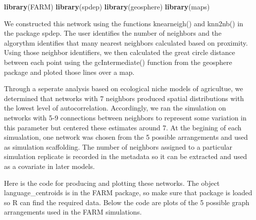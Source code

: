 \documentclass[]{book}
\newenvironment{Shaded}{\begin{snugshade}}{\end{snugshade}}
\newcommand{\KeywordTok}[1]{\textcolor[rgb]{0.13,0.29,0.53}{\textbf{{#1}}}}
\newcommand{\NormalTok}[1]{{#1}}
\theoremstyle{definition}
\theoremstyle{definition}
\theoremstyle{definition}
\theoremstyle{remark}
\begin{document}
\begin{Shaded}
\begin{Highlighting}[]
\KeywordTok{library}\NormalTok{(FARM)}
\KeywordTok{library}\NormalTok{(spdep)}
\KeywordTok{library}\NormalTok{(geosphere)}
\KeywordTok{library}\NormalTok{(maps)}
\end{Highlighting}
\end{Shaded}

We constructed this network using the functions knearneigh() and
knn2nb() in the package spdep. The user identifies the number of
neighbors and the algorythm identifies that many nearest neighbors
calculated based on proximity. Using those neighbor identifiers, we then
calculated the great circle distance between each point using the
gcIntermediate() function from the geosphere package and ploted those
lines over a map.

Through a seperate analysis based on ecological niche models of
agricultue, we determined that networks with 7 neighbors produced
spatial distributions with the lowest level of autocorrelation.
Accordingly, we ran the simulation on networks with 5-9 connections
between neighbors to represent some variation in this parameter but
centered these estimates around 7. At the begining of each simualation,
one network was chosen from the 5 possible arrangements and used as
simulation scaffolding. The number of neighbors assigned to a particular
simulation replicate is recorded in the metadata so it can be extracted
and used as a covariate in later models.

Here is the code for producing and plotting these networks. The object
language\_centroids is in the FARM package, so make sure that package is
loaded so R can find the required data. Below the code are plots of the
5 possible graph arrangements used in the FARM simulations.
\end{document}
